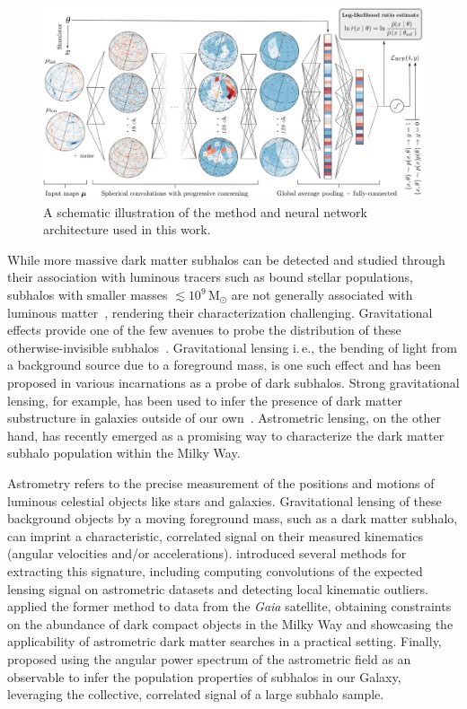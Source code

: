 \documentclass[twocolumn,linenumbers,anonymous]{aastex631}
\newcommand{\ie}{{i.\,e.}\xspace}
\begin{document}
\begin{figure}[!htbp]
\centering
\includegraphics[width=1.00\textwidth]{summary.pdf}
\caption{A schematic illustration of the method and neural network architecture used in this work.}
\label{fig:model}
\end{figure}

While more massive dark matter subhalos can be detected and studied through their association with luminous tracers such as bound stellar populations, subhalos with smaller masses $\lesssim 10^9\,\mathrm M_\odot$ are not generally associated with luminous matter~\citep{Fitts:2016usl,2017MNRAS.467.2019R}, rendering their characterization challenging. Gravitational effects provide one of the few avenues to probe the distribution of these otherwise-invisible subhalos~\citep{Buckley:2017ijx}. Gravitational lensing \ie, the bending of light from a background source due to a foreground mass, is one such effect and has been proposed in various incarnations as a probe of dark subhalos. 
Strong gravitational lensing, for example, has been used to infer the presence of dark matter substructure in galaxies outside of our own~\citep{Hezaveh:2016ltk,Vegetti:2009cz,Gilman:2019nap,Vegetti:2012mc}.
Astrometric lensing, on the other hand, has recently emerged as a promising way to characterize the dark matter subhalo population within the Milky Way.

Astrometry refers to the precise measurement of the positions and motions of luminous celestial objects like stars and galaxies. Gravitational lensing of these background objects by a moving foreground mass, such as a dark matter subhalo, can imprint a characteristic, correlated signal on their measured kinematics (angular velocities and/or accelerations). \citet{VanTilburg:2018ykj} introduced several methods for extracting this signature, including computing convolutions of the expected lensing signal on astrometric datasets and detecting local kinematic outliers. \citet{Mondino:2020rkn} applied the former method to data from the \emph{Gaia} satellite, obtaining constraints on the abundance of dark compact objects in the Milky Way and showcasing the applicability of astrometric dark matter searches in a practical setting. Finally, \citet{Mishra-Sharma:2020ynk} proposed using the angular power spectrum of the astrometric field as an observable to infer the population properties of subhalos in our Galaxy, leveraging the collective, correlated signal of a large subhalo sample. 
\end{document}

